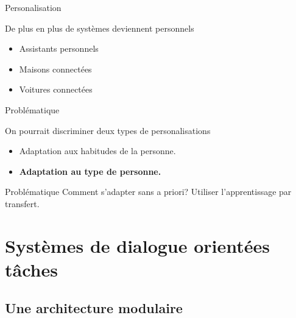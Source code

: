 \documentclass[french,handout]{beamer}
\begin{document}
    \begin{frame}{Personalisation}

        De plus en plus de systèmes deviennent personnels

        \begin{itemize}
            \item Assistants personnels %
            \item Maisons connectées %
            \item Voitures connectées
        \end{itemize}

    \end{frame}

    \begin{frame}{Problématique}

        On pourrait discriminer deux types de personalisations

        \begin{itemize}
            \item Adaptation aux habitudes de la personne.
            \item \textbf{Adaptation au type de personne.}
        \end{itemize}


        \begin{alertblock}{Problématique}
            Comment s'adapter sans a priori? Utiliser l'apprentissage par transfert.
        \end{alertblock}

    \end{frame}


    \section{Systèmes de dialogue orientées tâches}



    \subsection{Une architecture modulaire}
\end{document}
